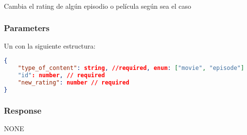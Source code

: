 Cambia el rating de algún episodio o película según sea el caso

\subsubsection{Parameters}
Un  con la siguiente estructura:

\begin{lstlisting}[language=json]
{
	"type_of_content": string, //required, enum: ["movie", "episode"]
	"id": number, // required
	"new_rating": number // required
}
\end{lstlisting}

\subsubsection{Response}
NONE